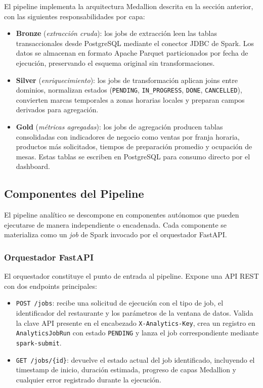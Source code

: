 El pipeline implementa la arquitectura Medallion descrita en la sección
anterior, con las siguientes responsabilidades por capa:

\begin{itemize}[leftmargin=1.5em]
  \item \textbf{Bronze} (\textit{extracción cruda}): los jobs de extracción
  leen las tablas transaccionales desde PostgreSQL mediante el conector JDBC
  de Spark. Los datos se almacenan en formato Apache Parquet particionados
  por fecha de ejecución, preservando el esquema original sin
  transformaciones.
  \item \textbf{Silver} (\textit{enriquecimiento}): los jobs de
  transformación aplican joins entre dominios, normalizan estados
  (\texttt{PENDING}, \texttt{IN\_PROGRESS}, \texttt{DONE},
  \texttt{CANCELLED}), convierten marcas temporales a zonas horarias
  locales y preparan campos derivados para agregación.
  \item \textbf{Gold} (\textit{métricas agregadas}): los jobs de agregación
  producen tablas consolidadas con indicadores de negocio como ventas por
  franja horaria, productos más solicitados, tiempos de preparación promedio
  y ocupación de mesas. Estas tablas se escriben en PostgreSQL para consumo
  directo por el dashboard.
\end{itemize}

\subsection{Componentes del Pipeline}

El pipeline analítico se descompone en componentes autónomos que pueden
ejecutarse de manera independiente o encadenada. Cada componente se
materializa como un \textit{job} de Spark invocado por el orquestador
FastAPI.

\subsubsection{Orquestador FastAPI}

El orquestador constituye el punto de entrada al pipeline. Expone una API
REST con dos endpoints principales:

\begin{itemize}[leftmargin=1.5em]
  \item \texttt{POST /jobs}: recibe una solicitud de ejecución con el tipo
  de job, el identificador del restaurante y los parámetros de la ventana
  de datos. Valida la clave API presente en el encabezado
  \texttt{X-Analytics-Key}, crea un registro en
  \texttt{AnalyticsJobRun} con estado \texttt{PENDING} y lanza el job
  correspondiente mediante \texttt{spark-submit}.
  \item \texttt{GET /jobs/\{id\}}: devuelve el estado actual del job
  identificado, incluyendo el timestamp de inicio, duración estimada,
  progreso de capas Medallion y cualquier error registrado durante la
  ejecución.
\end{itemize}

